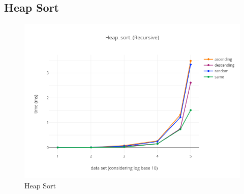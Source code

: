 \documentclass[paper=letter, fontsize=12pt]{article}
\begin{document}
\subsection{Heap Sort}
\begin{figure}[H]
	\centering
	\includegraphics[scale=0.75]{../analysis/Heap_sort_(Recursive).png}
	\caption{Heap Sort}
\end{figure}
%
%

\end{document}
